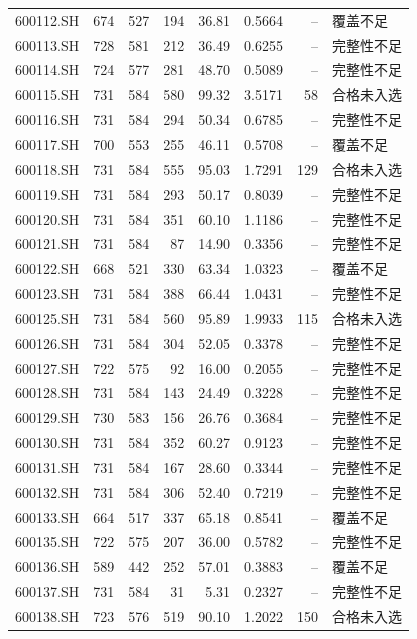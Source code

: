 \documentclass[10pt,a4paper]{article}
\begin{document}
\begin{longtable}{lrrr r r r l}
600112.SH & 674 & 527 & 194 & 36.81 & 0.5664 & -- & 覆盖不足\\
600113.SH & 728 & 581 & 212 & 36.49 & 0.6255 & -- & 完整性不足\\
600114.SH & 724 & 577 & 281 & 48.70 & 0.5089 & -- & 完整性不足\\
600115.SH & 731 & 584 & 580 & 99.32 & 3.5171 & 58 & 合格未入选\\
600116.SH & 731 & 584 & 294 & 50.34 & 0.6785 & -- & 完整性不足\\
600117.SH & 700 & 553 & 255 & 46.11 & 0.5708 & -- & 覆盖不足\\
600118.SH & 731 & 584 & 555 & 95.03 & 1.7291 & 129 & 合格未入选\\
600119.SH & 731 & 584 & 293 & 50.17 & 0.8039 & -- & 完整性不足\\
600120.SH & 731 & 584 & 351 & 60.10 & 1.1186 & -- & 完整性不足\\
600121.SH & 731 & 584 & 87 & 14.90 & 0.3356 & -- & 完整性不足\\
600122.SH & 668 & 521 & 330 & 63.34 & 1.0323 & -- & 覆盖不足\\
600123.SH & 731 & 584 & 388 & 66.44 & 1.0431 & -- & 完整性不足\\
600125.SH & 731 & 584 & 560 & 95.89 & 1.9933 & 115 & 合格未入选\\
600126.SH & 731 & 584 & 304 & 52.05 & 0.3378 & -- & 完整性不足\\
600127.SH & 722 & 575 & 92 & 16.00 & 0.2055 & -- & 完整性不足\\
600128.SH & 731 & 584 & 143 & 24.49 & 0.3228 & -- & 完整性不足\\
600129.SH & 730 & 583 & 156 & 26.76 & 0.3684 & -- & 完整性不足\\
600130.SH & 731 & 584 & 352 & 60.27 & 0.9123 & -- & 完整性不足\\
600131.SH & 731 & 584 & 167 & 28.60 & 0.3344 & -- & 完整性不足\\
600132.SH & 731 & 584 & 306 & 52.40 & 0.7219 & -- & 完整性不足\\
600133.SH & 664 & 517 & 337 & 65.18 & 0.8541 & -- & 覆盖不足\\
600135.SH & 722 & 575 & 207 & 36.00 & 0.5782 & -- & 完整性不足\\
600136.SH & 589 & 442 & 252 & 57.01 & 0.3883 & -- & 覆盖不足\\
600137.SH & 731 & 584 & 31 & 5.31 & 0.2327 & -- & 完整性不足\\
600138.SH & 723 & 576 & 519 & 90.10 & 1.2022 & 150 & 合格未入选\\

\end{longtable}
\end{document}
